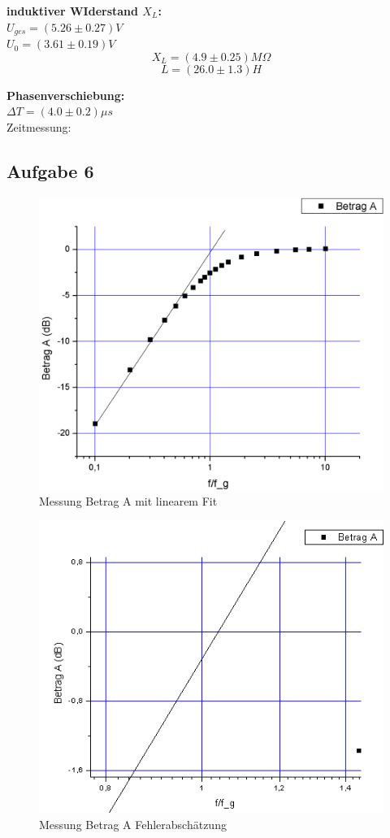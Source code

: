 \documentclass[12pt,a4paper]{article}
\begin{document}
\begin{multicols}{2}
\textbf{induktiver WIderstand $X_L$:}\\
$U_{ges}=(5.26\pm 0.27)V$\\
$U_0=(3.61 \pm 0.19)V$\\
$$X_L=(4.9\pm 0.25)M\Omega$$
$$L=(26.0 \pm 1.3)H$$

\textbf{Phasenverschiebung:}\\
$\Delta T = (4.0\pm 0.2) \mu s$\\
Zeitmessung:


\subsection{Aufgabe 6}
\begin{figure}[H]
	\centering
	\includegraphics[scale=0.25]{./figure/betrag_a.png}
	\caption{Messung Betrag A mit linearem Fit}
	\label{fig:betraga_linfit}
\end{figure}
\begin{figure}[H]
	\centering
	\includegraphics[scale=0.45]{./figure/betrag_a_zoom.png}
	\caption{Messung Betrag A Fehlerabschätzung}
	\label{fig:betraga_abweichung}
\end{figure}


\end{multicols}
\end{document}
